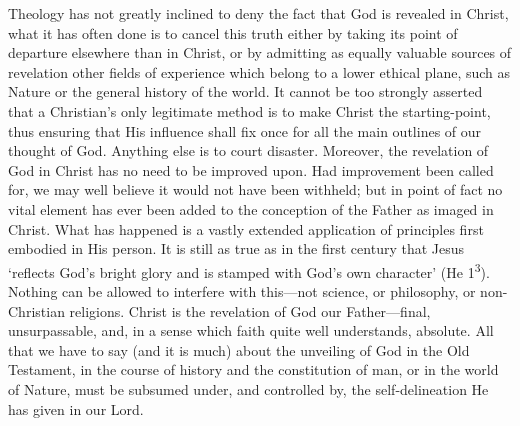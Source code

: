 \documentclass[12pt,a5paper]{article}
\begin{document}
Theology has not greatly inclined to deny the fact that God is revealed in Christ, what it has often done is to cancel this truth either by taking its point of departure elsewhere than in Christ, or by admitting as equally valuable sources of revelation other fields of experience which belong to a lower ethical plane, such as Nature or the general history of the world. It cannot be too strongly asserted that a Christian's only legitimate method is to make Christ the starting-point, thus ensuring that His influence shall fix once for all the main outlines of our thought of God. Anything else is to court disaster. Moreover, the revelation of God in Christ has no need to be improved upon. Had improvement been called for, we may well believe it would not have been withheld; but in point of fact no vital element has ever been added to the conception of the Father as imaged in Christ. What has happened is a vastly extended application of principles first embodied in His person. It is still as true as in the first century that Jesus `reflects God's bright glory and is stamped with God's own character' (He 1\textsuperscript{3}). Nothing can be allowed to interfere with this---not science, or philosophy, or non-Christian religions. Christ is the revelation of God our Father---final, unsurpassable, and, in a sense which faith quite well understands, absolute. All that we have to say (and it is much) about the unveiling of God in the Old Testament, in the course of history and the constitution of man, or in the world of Nature, must be subsumed under, and controlled by, the self-delineation He has given in our Lord.
\end{document}
